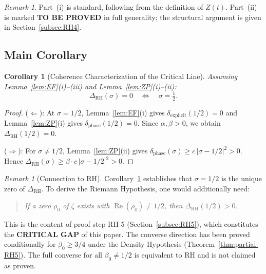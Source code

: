 \documentclass[11pt]{article}
\newtheorem{corollary}[theorem]{Corollary}
\theoremstyle{remark}
\newtheorem{remark}[theorem]{Remark}
\DeclareMathOperator{\Rea}{Re}
\begin{document}
\begin{remark}
Part~(i) is standard, following from the definition of $Z(t)$.
Part~(ii) is marked \textbf{TO BE PROVED} in full generality; the structural argument
is given in Section~\ref{subsec:RH4}.
\end{remark}

\subsection{Main Corollary}

\begin{corollary}[Coherence Characterization of the Critical Line]
\label{cor:RH}
Assuming Lemma~\ref{lem:EF}(i)--(iii) and Lemma~\ref{lem:ZP}(i)--(ii):
\begin{equation}\label{eq:corollary}
  \Delta_{\mathrm{RH}}(\sigma)=0 \quad\Longleftrightarrow\quad \sigma=\tfrac{1}{2}.
\end{equation}
\end{corollary}

\begin{proof}
($\Leftarrow$): At $\sigma=1/2$, Lemma~\ref{lem:EF}(i) gives
$\delta_{\mathrm{explicit}}(1/2)=0$ and Lemma~\ref{lem:ZP}(i) gives
$\delta_{\mathrm{phase}}(1/2)=0$.
Since $\alpha,\beta>0$, we obtain $\Delta_{\mathrm{RH}}(1/2)=0$.

($\Rightarrow$): For $\sigma\neq 1/2$, Lemma~\ref{lem:ZP}(ii) gives
$\delta_{\mathrm{phase}}(\sigma)\geq c\,|\sigma-1/2|^2>0$.
Hence $\Delta_{\mathrm{RH}}(\sigma)\geq \beta\cdot c\,|\sigma-1/2|^2>0$.
\end{proof}

\begin{remark}[Connection to RH]
\label{rem:RH-gap}
Corollary~\ref{cor:RH} establishes that $\sigma=1/2$ is the unique zero of
$\Delta_{\mathrm{RH}}$.
To derive the Riemann Hypothesis, one would additionally need:
\begin{quote}
  \emph{If a zero $\rho_0$ of $\zeta$ exists with $\Rea(\rho_0)\neq 1/2$, then
  $\Delta_{\mathrm{RH}}(1/2)>0$.}
\end{quote}
This is the content of proof step RH-5 (Section~\ref{subsec:RH5}), which constitutes
the \textbf{CRITICAL GAP} of this paper.
The converse direction has been proved conditionally for $\beta_0 \geq 3/4$
under the Density Hypothesis (Theorem~\ref{thm:partial-RH5}).
The full converse for all $\beta_0 \neq 1/2$ is equivalent to RH and
is not claimed as proven.
\end{remark}
\end{document}
